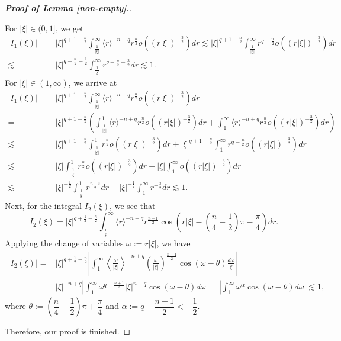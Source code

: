 \documentclass[11pt,reqno]{amsart}
\begin{document}
\begin{proof}[\textbf{Proof of Lemma \ref{non-empty}.}]
\begin{itemize}[leftmargin=*]
\noindent For $|\xi| \in (0, 1]$, we get
\begin{align*}
|I_1(\xi)|=&|\xi|^{q+1-\frac{n}{2}} \int_\frac{1}{|\xi|}^\infty \langle r\rangle^{-n+q}r^\frac{n}{2} o\left((r|\xi|)^{-\frac{3}{2}}\right) d r\lesssim |\xi|^{q+1-\frac{n}{2}} \int_\frac{1}{|\xi|}^\infty r^{q-\frac{n}{2}} o\left((r|\xi|)^{-\frac{3}{2}}\right) d r \\
\lesssim & |\xi|^{q-\frac{n}{2}-\frac{1}{2}} \int_\frac{1}{|\xi|}^\infty r^{q-\frac{n}{2}-\frac{3}{2}} d r \lesssim 1.
\end{align*}
For $|\xi| \in (1, \infty)$, we arrive at
\begin{align*}
|I_1(\xi)|=&|\xi|^{q+1-\frac{n}{2}} \int_\frac{1}{|\xi|}^\infty \langle r\rangle^{-n+q}r^\frac{n}{2} o\left((r|\xi|)^{-\frac{3}{2}}\right) d r \\
=&|\xi|^{q+1-\frac{n}{2}} \left(\int_\frac{1}{|\xi|}^1 \langle r\rangle^{-n+q}r^\frac{n}{2} o\left((r|\xi|)^{-\frac{3}{2}}\right) d r+\int_1^\infty \langle r\rangle^{-n+q} r^\frac{n}{2} o\left((r|\xi|)^{-\frac{3}{2}}\right) d r\right) \\
\lesssim & |\xi|^{q+1-\frac{n}{2}} \int_\frac{1}{|\xi|}^1 r^\frac{n}{2} o\left((r|\xi|)^{-\frac{3}{2}}\right) d r +|\xi|^{q+1-\frac{n}{2}} \int_1^\infty r^{q-\frac{n}{2}}  o\left((r|\xi|)^{-\frac{3}{2}}\right) d r \\
\lesssim & |\xi| \int_\frac{1}{|\xi|}^1 r^\frac{n}{2} o\left((r|\xi|)^{-\frac{3}{2}}\right) d r +|\xi| \int_1^\infty  o\left((r|\xi|)^{-\frac{3}{2}}\right) d r \\
\lesssim & |\xi|^{-\frac{1}{2}} \int_\frac{1}{|\xi|}^1  r^\frac{n-3}{2} d r +|\xi|^{-\frac{1}{2}} \int_1^\infty r^{-\frac{3}{2}} d r\lesssim 1.
\end{align*}
Next, for the integral $I_2(\xi)$, we see that
$$
I_2(\xi)=|\xi|^{q+\frac{1}{2}-\frac{n}{2}} \int_{\frac{1}{|\xi|}}^{\infty}\langle r\rangle^{-n+q}r^{\frac{n-1}{2}} \cos \left(r|\xi|-\left(\frac{n}{4}-\frac{1}{2}\right) \pi-\frac{\pi}{4}\right) d r.
$$
Applying the change of variables $\omega :=r|\xi|$, we have
\begin{align*}
|I_2(\xi)|=&|\xi|^{q+\frac{1}{2}-\frac{n}{2}} \left|\int_1^{\infty}\left\langle\frac{\omega}{|\xi|}\right\rangle^{-n+q}\left(\frac{\omega}{|\xi|}\right)^{\frac{n-1}{2}} \cos (\omega-\theta) \frac{d \omega}{|\xi|}\right| \\
= & |\xi|^{-n+q} \left|\int_1^{\infty}\omega^{q-\frac{n+1}{2}}|\xi|^{n-q}\cos (\omega-\theta) d \omega\right|=\left|\int_1^{\infty}\omega^{\alpha}\cos (\omega-\theta) d \omega\right| \lesssim 1, 
\end{align*}
where $\theta:=\left(\dfrac{n}{4}-\dfrac{1}{2}\right) \pi+\dfrac{\pi}{4}$ and $\alpha:=q-\dfrac{n+1}{2}<-\dfrac{1}{2}$.
\end{itemize}
Therefore, our proof is finished.
\end{proof}
\end{document}
